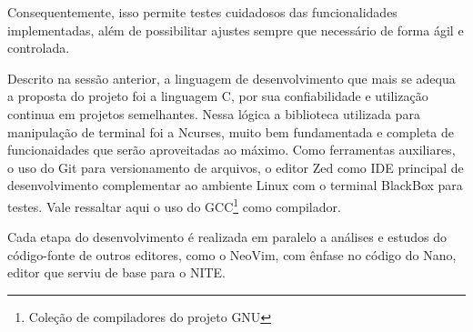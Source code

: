 Consequentemente, isso permite testes cuidadosos das funcionalidades
implementadas, além de possibilitar ajustes sempre que necessário de forma ágil e
controlada.

Descrito na sessão anterior, a linguagem de desenvolvimento que mais se adequa a
proposta do projeto foi a linguagem C, por sua confiabilidade e utilização continua
em projetos semelhantes. Nessa lógica a biblioteca utilizada para manipulação de
terminal foi a Ncurses, muito bem fundamentada e completa de funcionaidades que serão
aproveitadas ao máximo. Como ferramentas auxiliares, o uso do Git para versionamento
de arquivos, o editor Zed como IDE principal de desenvolvimento complementar ao
ambiente Linux com o terminal BlackBox para testes. Vale ressaltar aqui o uso do
GCC\footnote{Coleção de compiladores do projeto GNU} como compilador.

Cada etapa do desenvolvimento é realizada em paralelo a análises e estudos do
código-fonte de outros editores, como o NeoVim, com ênfase no código do Nano, editor
que serviu de base para o NITE.